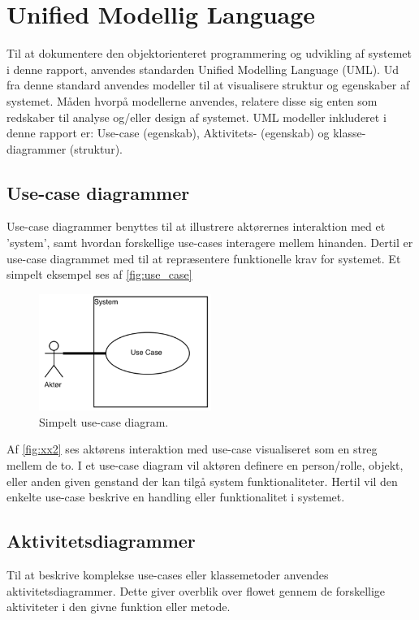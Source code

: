 \section{Unified Modellig Language}
Til at dokumentere den objektorienteret programmering og udvikling af systemet i denne rapport, anvendes standarden Unified Modelling Language (UML). Ud fra denne standard anvendes modeller til at visualisere struktur og egenskaber af systemet. Måden hvorpå modellerne anvendes, relatere disse sig enten som redskaber til analyse og/eller design af systemet. 
UML modeller inkluderet i denne rapport er:  Use-case (egenskab), Aktivitets- (egenskab) og klasse-diagrammer (struktur).


\subsection{Use-case diagrammer} 
Use-case diagrammer benyttes til at illustrere aktørernes interaktion med et 'system', samt hvordan forskellige use-cases interagere mellem hinanden. Dertil er use-case diagrammet med til at repræsentere funktionelle krav for systemet. Et simpelt eksempel ses af \autoref{fig:use_case} 

\begin{figure} [H]
\centering
\includegraphics[width=0.5\textwidth]{figures/USE_CASE2}
\caption{Simpelt use-case diagram.}
\label{fig:use_case}
\end{figure}

Af \autoref{fig:xx2} ses aktørens interaktion med use-case visualiseret som en streg mellem de to. I et use-case diagram vil aktøren definere en person/rolle, objekt, eller anden given genstand der kan tilgå system funktionaliteter. Hertil vil den enkelte use-case beskrive en handling eller funktionalitet i systemet. 


\subsection{Aktivitetsdiagrammer}
Til at beskrive komplekse use-cases eller klassemetoder anvendes aktivitetsdiagrammer. Dette giver overblik over flowet gennem de forskellige aktiviteter i den givne funktion eller metode.     

